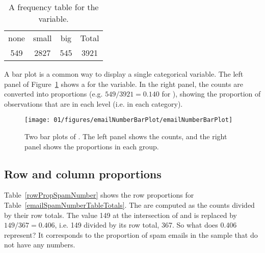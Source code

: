 \begin{table}[htb]
\centering
\begin{tabular}{cccc}
  \hline
none & small & big & Total \\ 
 549 & 2827 & 545 & 3921 \\
   \hline
\end{tabular}
\caption{A frequency table for the  variable.}
\label{emailNumberTable}
\end{table}


A bar plot is a common way to display a single categorical variable. The left panel of Figure~\ref{emailNumberBarPlot} shows a  for the  variable. In the right panel, the counts are converted into proportions (e.g. $549/3921=0.140$ for ), showing the proportion of observations that are in each level (i.e. in each category).

\begin{figure}[bht]
   \centering
   \texttt{[image: 01/figures/emailNumberBarPlot/emailNumberBarPlot]}
   \caption{Two bar plots of . The left panel shows the counts, and the right panel shows the proportions in each group.}
   \label{emailNumberBarPlot}
\end{figure}


\subsection{Row and column proportions}

Table~\ref{rowPropSpamNumber} shows the row proportions for Table~\ref{emailSpamNumberTableTotals}. The  are computed as the counts divided by their row totals. The value 149 at the intersection of  and  is replaced by $149/367=0.406$, i.e. 149 divided by its row total, 367. So what does 0.406 represent? It corresponds to the proportion of spam emails in the sample that do not have any numbers.

